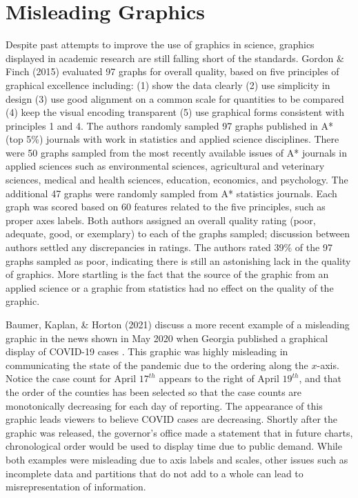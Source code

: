 \documentclass[print]{nuthesis}
\begin{document}
\hypertarget{misleading-graphics}{%
\section{Misleading Graphics}\label{misleading-graphics}}

Despite past attempts to improve the use of graphics in science, graphics displayed in academic research are still falling short of the standards. Gordon \& Finch (2015) evaluated 97 graphs for overall quality, based on five principles of graphical excellence including: (1) show the data clearly (2) use simplicity in design (3) use good alignment on a common scale for quantities to be compared (4) keep the visual encoding transparent (5) use graphical forms consistent with principles 1 and 4.
The authors randomly sampled 97 graphs published in A* (top 5\%) journals with work in statistics and applied science disciplines.
There were 50 graphs sampled from the most recently available issues of A* journals in applied sciences such as environmental sciences, agricultural and veterinary sciences, medical and health sciences, education, economics, and psychology.
The additional 47 graphs were randomly sampled from A* statistics journals.
Each graph was scored based on 60 features related to the five principles, such as proper axes labels.
Both authors assigned an overall quality rating (poor, adequate, good, or exemplary) to each of the graphs sampled; discussion between authors settled any discrepancies in ratings.
The authors rated 39\% of the 97 graphs sampled as poor, indicating there is still an astonishing lack in the quality of graphics.
More startling is the fact that the source of the graphic from an applied science or a graphic from statistics had no effect on the quality of the graphic.

Baumer, Kaplan, \& Horton (2021) discuss a more recent example of a misleading graphic in the news shown in May 2020 when Georgia published a graphical display of COVID-19 cases .
This graphic was highly misleading in communicating the state of the pandemic due to the ordering along the \(x\)-axis.
Notice the case count for April \(17^{th}\) appears to the right of April \(19^{th}\), and that the order of the counties has been selected so that the case counts are monotonically decreasing for each day of reporting.
The appearance of this graphic leads viewers to believe COVID cases are decreasing.
Shortly after the graphic was released, the governor's office made a statement that in future charts, chronological order would be used to display time due to public demand. While both examples were misleading due to axis labels and scales, other issues such as incomplete data and partitions that do not add to a whole can lead to misrepresentation of information.
\end{document}
